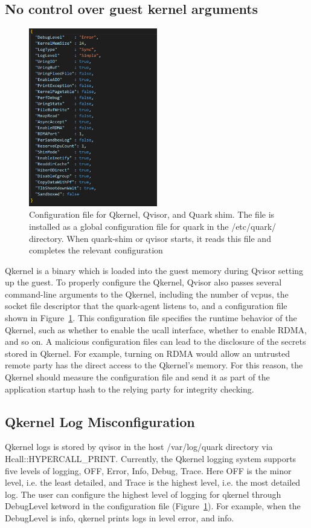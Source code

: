 \subsection{No control over guest kernel arguments}
\begin{figure}[H]
  \centering
  \includegraphics[width=0.5\textwidth,height=0.4\textheight]{images/quark_config.PNG}
  \caption[Configuration file for Qkernel, Qvisor, and Quark shim]{Configuration file for Qkernel, Qvisor, and Quark shim. The file is installed as a global configuration file for quark in the /etc/quark/ directory. When quark-shim or qvisor starts, it reads this file and completes the relevant configuration}
  \label{fig:quark_config}
\end{figure}

Qkernel is a binary which is loaded into the guest memory during Qvisor setting up the guest. To properly configure the Qkernel,  Qvisor also passes several command-line arguments to the Qkernel, including the number of vcpus, the socket file 
descriptor that the quark-agent listens to, and a configuration file shown in Figure~\ref{fig:quark_config}. This configuration file specifies the runtime behavior of the Qkernel, such as whether to enable the ucall interface, whether to enable RDMA, and so on. A malicious configuration 
files can lead to the disclosure of the secrets stored in Qkernel. For example, turning on RDMA would allow an untrusted remote party has the direct access to the Qkernel’s memory. For this reason, the Qkernel should measure the configuration file 
and send it as part of the application startup hash to the relying party for integrity checking. 

\subsection{Qkernel Log Misconfiguration}
Qkernel logs is stored by qvisor in the host /var/log/quark directory via Hcall::HYPERCALL\_PRINT. Currently, the Qkernel logging system supports five levels of logging, OFF, Error, Info, Debug, Trace. Here OFF is the minor level, i.e. the least 
detailed, and Trace is the highest level, i.e. the most detailed log. The user can configure the highest level of logging for qkernel through DebugLevel ketword in the configuration file (Figure~\ref{fig:quark_config}). For example, when the DebugLevel is info, qkernel 
prints logs in level error, and info. 

